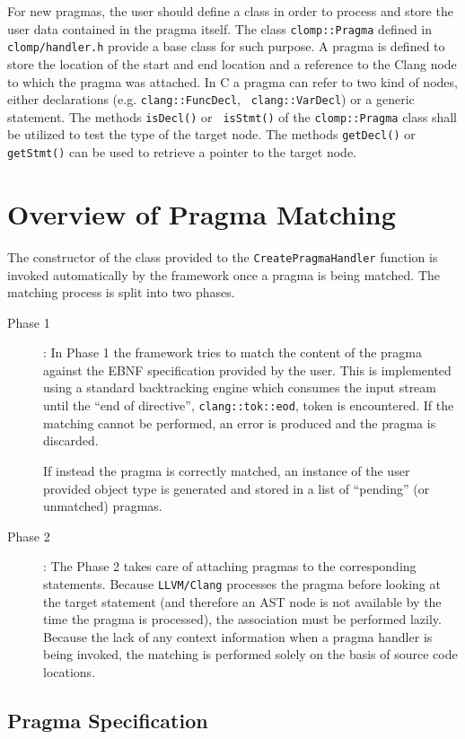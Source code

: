 \documentclass[10pt]{report}
\begin{document}
For new pragmas, the user should define a class in order to process and store
the user data contained in the pragma itself. The class {\tt clomp::Pragma}
defined in {\tt clomp/handler.h} provide a base class for such purpose. A pragma
is defined to store the location of the start and end location and a reference
to the Clang node to which the pragma was attached. In C a pragma can refer to
two kind of nodes, either declarations (e.g. {\tt clang::FuncDecl}, {\tt
clang::VarDecl}) or a generic statement. The methods {\tt isDecl()} or {\tt
isStmt()} of the {\tt clomp::Pragma} class shall be utilized to test the type of
the target node. The methods {\tt getDecl()} or {\tt getStmt()} can be used to
retrieve a pointer to the target node. 

\section{Overview of Pragma Matching}

The constructor of the class provided to the {\tt CreatePragmaHandler} function
is invoked automatically by the framework once a pragma is being matched. The
matching process is split into two phases.

\begin{description}
\item [Phase 1]: In Phase 1 the framework tries to match the content of the
pragma against the EBNF specification provided by the user. This is implemented
using a standard backtracking engine which consumes the input stream until the
``end of directive'', {\tt clang::tok::eod}, token is encountered. If the
matching cannot be performed, an error is produced and the pragma is discarded.

If instead the pragma is correctly matched, an instance of the user provided
object type is generated and stored in a list of ``pending'' (or unmatched)
pragmas.

\item [Phase 2]: The Phase 2 takes care of attaching pragmas to the
corresponding statements. Because {\tt LLVM/Clang} processes the pragma before
looking at the target statement (and therefore an AST node is not available by
the time the pragma is processed), the association must be performed lazily.
Because the lack of any context information when a pragma handler is being
invoked, the matching is performed solely on the basis of source code
locations. 
\end{description}


\subsection{Pragma Specification}
\end{document}
